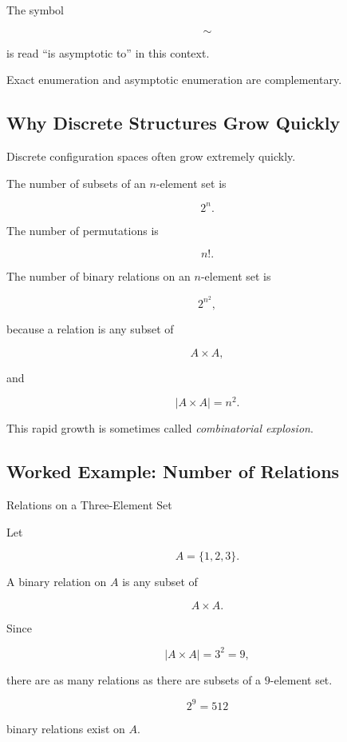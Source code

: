 The symbol

\[
\sim
\]

is read ``is asymptotic to'' in this context.

Exact enumeration and asymptotic enumeration are complementary.

\subsection{Why Discrete Structures Grow Quickly}
\label{subsec:combinatorial-growth}

Discrete configuration spaces often grow extremely quickly.

The number of subsets of an \(n\)-element set is

\[
2^n.
\]

The number of permutations is

\[
n!.
\]

The number of binary relations on an \(n\)-element set is

\[
\boxed{
2^{n^2},
}
\]

because a relation is any subset of

\[
A\times A,
\]

and

\[
|A\times A|=n^2.
\]

This rapid growth is sometimes called \emph{combinatorial explosion}.

\subsection{Worked Example: Number of Relations}
\label{subsec:worked-number-relations}

\begin{workedexamplebox}{Relations on a Three-Element Set}

Let

\[
A=\{1,2,3\}.
\]

A binary relation on \(A\) is any subset of

\[
A\times A.
\]

Since

\[
|A\times A|=3^2=9,
\]

there are as many relations as there are subsets of a \(9\)-element
set.

\begin{answerbox}
\[
\boxed{
2^9=512
}
\]

binary relations exist on \(A\).
\end{answerbox}

\end{workedexamplebox}

